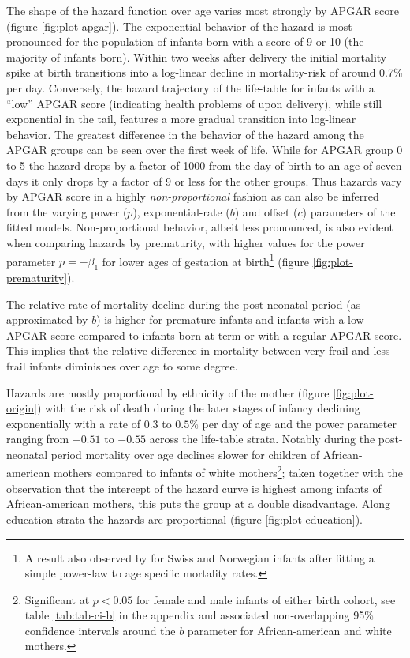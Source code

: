 \documentclass[smallextended]{svjour3} %
\begin{document}
The shape of the hazard function over age varies most strongly by APGAR
score (figure \ref{fig:plot-apgar}). The exponential behavior of the
hazard is most pronounced for the population of infants born with a
score of 9 or 10 (the majority of infants born). Within two weeks after
delivery the initial mortality spike at birth transitions into a
log-linear decline in mortality-risk of around 0.7\% per day.
Conversely, the hazard trajectory of the life-table for infants with a
``low'' APGAR score (indicating health problems of upon delivery), while
still exponential in the tail, features a more gradual transition into
log-linear behavior. The greatest difference in the behavior of the
hazard among the APGAR groups can be seen over the first week of life.
While for APGAR group 0 to 5 the hazard drops by a factor of 1000 from
the day of birth to an age of seven days it only drops by a factor of 9
or less for the other groups. Thus hazards vary by APGAR score in a
highly \emph{non-proportional} fashion as can also be inferred from the
varying power (\(p\)), exponential-rate (\(b\)) and offset (\(c\))
parameters of the fitted models. Non-proportional behavior, albeit less
pronounced, is also evident when comparing hazards by prematurity, with
higher values for the power parameter \(p=-\beta_1\) for lower ages of
gestation at birth\footnote{A result also observed by \citet{Berrut2016}
  for Swiss and Norwegian infants after fitting a simple power-law to
  age specific mortality rates.} (figure \ref{fig:plot-prematurity}).

The relative rate of mortality decline during the post-neonatal period
(as approximated by \(b\)) is higher for premature infants and infants
with a low APGAR score compared to infants born at term or with a
regular APGAR score. This implies that the relative difference in
mortality between very frail and less frail infants diminishes over age
to some degree.

Hazards are mostly proportional by ethnicity of the mother (figure
\ref{fig:plot-origin}) with the risk of death during the later stages of
infancy declining exponentially with a rate of \(0.3\) to \(0.5\%\) per
day of age and the power parameter ranging from \(-0.51\) to \(-0.55\)
across the life-table strata. Notably during the post-neonatal period
mortality over age declines slower for children of African-american
mothers compared to infants of white mothers\footnote{Significant at
  \(p<0.05\) for female and male infants of either birth cohort, see
  table \ref{tab:tab-ci-b} in the appendix and associated
  non-overlapping 95\% confidence intervals around the \(b\) parameter
  for African-american and white mothers.}; taken together with the
observation that the intercept of the hazard curve is highest among
infants of African-american mothers, this puts the group at a double
disadvantage. Along education strata the hazards are proportional
(figure \ref{fig:plot-education}).
\end{document}
